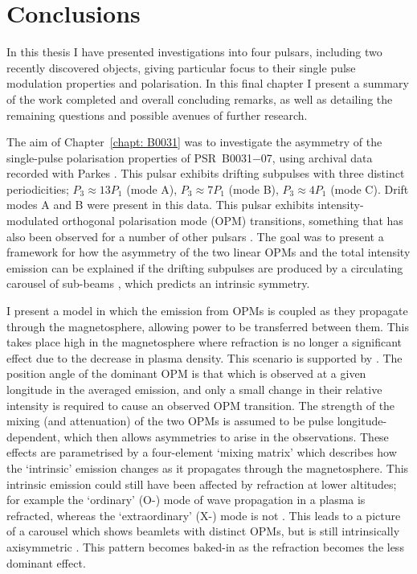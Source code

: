 \chapter[Conclusions]{Conclusions}
\label{chapt: conclusions}

In this thesis I have presented investigations into four pulsars, including two recently discovered objects, giving particular focus to their single pulse modulation properties and polarisation. In this final chapter I present a summary of the work completed and overall concluding remarks, as well as detailing the remaining questions and possible avenues of further research.

The aim of Chapter~\ref{chapt: B0031} was to investigate the asymmetry of the single-pulse polarisation properties of PSR~B0031$-$07, using archival data recorded with Parkes \citep{IWJ+2020}. This pulsar exhibits drifting subpulses with three distinct periodicities; $P_3 \approx 13P_1$ (mode A), $P_3 \approx 7P_1$ (mode B), $P_3 \approx 4P_1$ (mode C). Drift modes A and B were present in this data. This pulsar exhibits intensity-modulated orthogonal polarisation mode (OPM) transitions, something that has also been observed for a number of other pulsars \citep{RRS+2002,RRxx2003, Exxx2004,Ixxx2019}. The goal was to present a framework for how the asymmetry of the two linear OPMs and the total intensity emission can be explained if the drifting subpulses are produced by a circulating carousel of sub-beams \citep[][]{RSxx1975}, which predicts an intrinsic symmetry.

I present a model in which the emission from OPMs is coupled as they propagate through the magnetosphere, allowing power to be transferred between them. This takes place high in the magnetosphere where refraction is no longer a significant effect due to the decrease in plasma density. This scenario is supported by \citet{Pxxx2001}.  The position angle of the dominant OPM is that which is observed at a given longitude in the averaged emission, and only a small change in their relative intensity is required to cause an observed OPM transition. The strength of the mixing (and attenuation) of the two OPMs is assumed to be pulse longitude-dependent, which then allows asymmetries to arise in the observations. These effects are parametrised by a four-element `mixing matrix' which describes how the `intrinsic' emission changes as it propagates through the magnetosphere. This intrinsic emission could still have been affected by refraction at lower altitudes; for example the `ordinary' (O-) mode of wave propagation in a plasma is refracted, whereas the `extraordinary' (X-) mode is not \citep{ABxx1986}. This leads to a picture of a carousel which shows beamlets with distinct OPMs, but is still intrinsically axisymmetric \citep[e.g.][]{PLxx2000, ESLx2003, RRL+2006}. This pattern becomes baked-in as the refraction becomes the less dominant effect.


